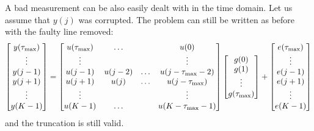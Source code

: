 A bad measurement can be also easily dealt with in the time domain. Let us assume that $y(j)$ was corrupted. The problem can still be written as before with the faulty line removed:
\begin{equation*}
  \begin{bmatrix}
y(\tau_\text{max}) \\ \vdots \\ y(j-1) \\ y(j+1) \\ \vdots \\ y(K-1)
  \end{bmatrix} =
  \begin{bmatrix}
    u(\tau_\text{max}) & \ldots & & u(0) \\
    \vdots & & & \vdots \\
    u(j-1) & u(j-2) & \ldots & u(j-\tau_\text{max}-2) \\
    u(j+1) & u(j) & \ldots & u(j-\tau_\text{max}) \\
    \vdots & & & \vdots \\
    u(K-1) & \ldots & & u(K-\tau_\text{max}-1)
  \end{bmatrix}
  \begin{bmatrix}
    g(0) \\ g(1) \\ \vdots \\ g(\tau_\text{max})
  \end{bmatrix} +
  \begin{bmatrix}
e(\tau_\text{max}) \\ \vdots \\ e(j-1) \\ e(j+1) \\ \vdots \\ e(K-1)
  \end{bmatrix}
\end{equation*}
and the truncation is still valid.

